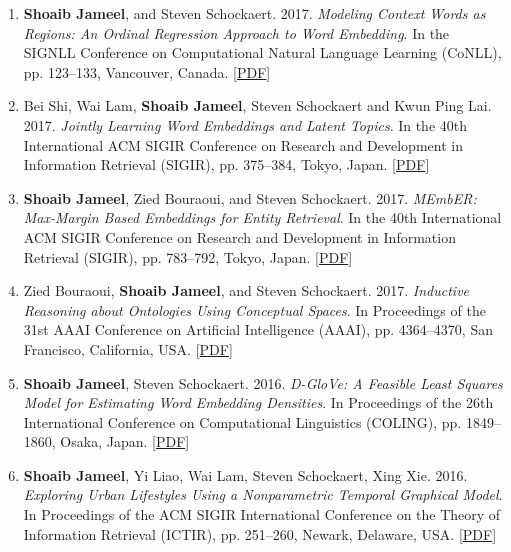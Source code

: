 \documentclass[margin]{res}
\begin{document}
\begin{resume}
\begin{enumerate}
\item \textbf{Shoaib Jameel}, and Steven Schockaert. 2017. \textit{Modeling Context Words as Regions: An Ordinal Regression Approach to Word Embedding}.  In the SIGNLL Conference on Computational Natural Language Learning (CoNLL), pp. 123--133, Vancouver, Canada. [\href{https://drive.google.com/open?id=18WMMGB-ohy_EkA_nyl3n8wDWMcLNX7HH}{PDF}] \newline

\item  Bei Shi, Wai Lam, \textbf{Shoaib Jameel}, Steven Schockaert and Kwun Ping Lai. 2017. \textit{Jointly Learning Word Embeddings and Latent Topics}. In the 40th International ACM SIGIR Conference on Research and Development in Information Retrieval (SIGIR), pp. 375--384, Tokyo, Japan. [\href{https://drive.google.com/open?id=1I_fmdLmae0SE1HEzBRO7Nv-RedkNlnAY}{PDF}] \newline

\item \textbf{Shoaib Jameel}, Zied Bouraoui, and Steven Schockaert. 2017. \textit{MEmbER: Max-Margin Based Embeddings for Entity Retrieval}. In the 40th International ACM SIGIR Conference on Research and Development in Information Retrieval (SIGIR), pp. 783--792, Tokyo, Japan. [\href{https://drive.google.com/open?id=1QVXU8E6VtG8TTKbfTeU4DvCifh8keWQa}{PDF}] \newline

\item Zied Bouraoui, \textbf{Shoaib Jameel}, and Steven Schockaert. 2017. \textit{Inductive Reasoning about Ontologies Using Conceptual Spaces}. In Proceedings of the 31st AAAI Conference on Artificial Intelligence (AAAI), pp. 4364--4370, San Francisco, California, USA. [\href{https://drive.google.com/open?id=1CDoH5kqyN3UnqDgwSGaGqBOxnT7vvime}{PDF}] \newline

\item \textbf{Shoaib Jameel}, Steven Schockaert. 2016. \textit{\uppercase{D}-\uppercase{G}loVe: \uppercase{A} Feasible Least Squares Model for Estimating Word Embedding Densities}. In Proceedings of the 26th International Conference on Computational Linguistics (COLING), pp. 1849--1860, Osaka, Japan. [\href{https://drive.google.com/open?id=1kgbHGwtLJBZPXKQWAMXp7WzNSLX9giFL}{PDF}] \newline

\item \textbf{Shoaib Jameel}, Yi Liao, Wai Lam, Steven Schockaert, Xing Xie. 2016. \textit{Exploring Urban Lifestyles Using a Nonparametric Temporal Graphical Model}. In Proceedings of the ACM SIGIR International Conference on the Theory of Information Retrieval (ICTIR), pp. 251--260, Newark, Delaware, USA. [\href{https://drive.google.com/open?id=1MrnfHbZO9jGJao9diVJihHmKIDj9KXRp}{PDF}] \newline


\end{enumerate}
\end{resume}
\end{document}
